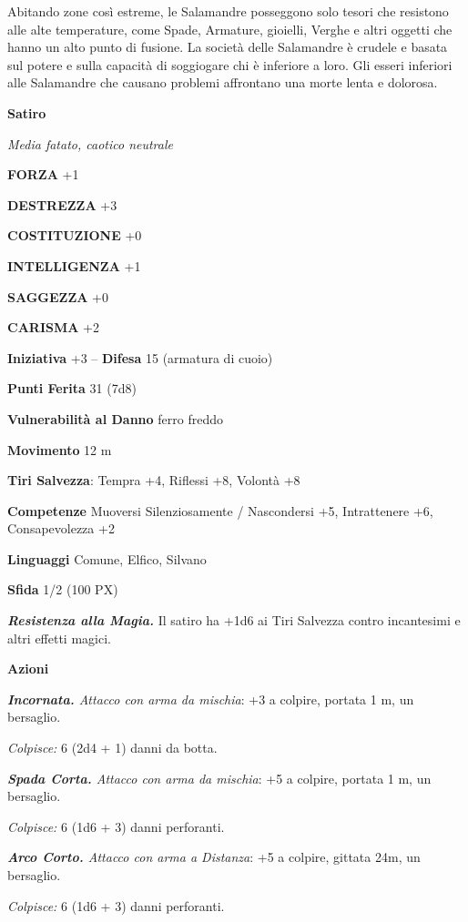 \begin{multicols}{2}
	Abitando zone così estreme, le Salamandre posseggono solo tesori che resistono alle alte temperature, come Spade, Armature, gioielli, Verghe e altri oggetti che hanno un alto punto di fusione. La società delle Salamandre è crudele e basata sul potere e sulla capacità di soggiogare chi è inferiore a loro. Gli esseri inferiori alle Salamandre che causano problemi affrontano una morte lenta e dolorosa.



	\medskip{}\textbf{Satiro}

	\textit{Media fatato, caotico neutrale}

	\textbf{FORZA} +1

	\textbf{DESTREZZA} +3

	\textbf{COSTITUZIONE} +0

	\textbf{INTELLIGENZA} +1

	\textbf{SAGGEZZA} +0

	\textbf{CARISMA} +2

	\textbf{Iniziativa} +3 -- \textbf{Difesa} 15 (armatura di cuoio)

	\textbf{Punti Ferita} 31 (7d8)

	\textbf{Vulnerabilità al Danno} ferro freddo

	\textbf{Movimento} 12 m

	\textbf{Tiri Salvezza}: Tempra +4, Riflessi +8, Volontà +8

	\textbf{Competenze} Muoversi Silenziosamente / Nascondersi +5, Intrattenere +6, Consapevolezza +2

	\textbf{Linguaggi} Comune, Elfico, Silvano

	\textbf{Sfida} 1/2 (100 PX)

	\textit{\textbf{Resistenza alla Magia.}} Il satiro ha +1d6 ai Tiri Salvezza contro incantesimi e altri effetti magici.

	\textbf{Azioni}

	\textit{\textbf{Incornata.} Attacco con arma da mischia}: +3 a colpire, portata 1 m, un bersaglio.

	\textit{Colpisce:} 6 (2d4 + 1) danni da botta.

	\textit{\textbf{Spada Corta.} Attacco con arma da mischia}: +5 a colpire, portata 1 m, un bersaglio.

	\textit{Colpisce:} 6 (1d6 + 3) danni perforanti.

	\textit{\textbf{Arco Corto.} Attacco con arma a Distanza}: +5 a colpire, gittata 24m, un bersaglio.

	\textit{Colpisce:} 6 (1d6 + 3) danni perforanti.


\end{multicols}
